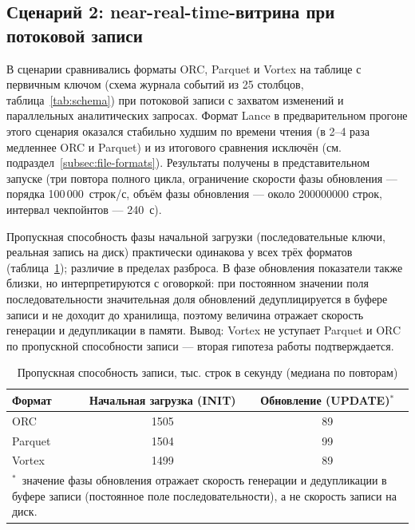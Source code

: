\subsection{Сценарий 2: near-real-time-витрина при потоковой записи}

В сценарии сравнивались форматы ORC, Parquet и Vortex на таблице с первичным ключом
(схема журнала событий из 25 столбцов, таблица~\ref{tab:schema}) при потоковой записи
с захватом изменений и параллельных аналитических запросах. Формат Lance в
предварительном прогоне этого сценария оказался стабильно худшим по времени чтения
(в \num{2}--\num{4} раза медленнее ORC и Parquet) и из итогового сравнения исключён
(см. подраздел~\ref{subsec:file-formats}). Результаты получены в
представительном запуске (три повтора полного цикла, ограничение скорости фазы
обновления --- порядка 100\,000~строк/с, объём фазы обновления --- около
\num{200000000} строк, интервал чекпойнтов --- 240~с).

Пропускная способность фазы начальной загрузки (последовательные
ключи, реальная запись на диск) практически одинакова у всех трёх форматов
(таблица~\ref{tab:write}); различие в пределах разброса. В фазе обновления показатели
также близки, но интерпретируются с оговоркой: при постоянном значении поля
последовательности значительная доля обновлений дедуплицируется в буфере записи и не
доходит до хранилища, поэтому величина отражает скорость генерации и дедупликации в
памяти. Вывод: Vortex не уступает Parquet и ORC по пропускной способности записи ---
вторая гипотеза работы подтверждается.

\begin{table}
    \caption{Пропускная способность записи, тыс. строк в секунду (медиана по повторам)}
    \label{tab:write}
    \begin{tabularx}{\textwidth}{|X|c|c|}\hline
    \textbf{Формат} & \textbf{Начальная загрузка (INIT)} & \textbf{Обновление (UPDATE)$^{*}$} \\ \hline
    ORC     & 1505 & 89 \\ \hline
    Parquet & 1504 & 99 \\ \hline
    Vortex  & 1499 & 89 \\ \hline
    \multicolumn{3}{|p{0.95\textwidth}|}{\footnotesize $^{*}$~значение фазы обновления отражает скорость генерации и дедупликации в буфере записи (постоянное поле последовательности), а не скорость записи на диск.} \\ \hline
    \end{tabularx}
\end{table}

